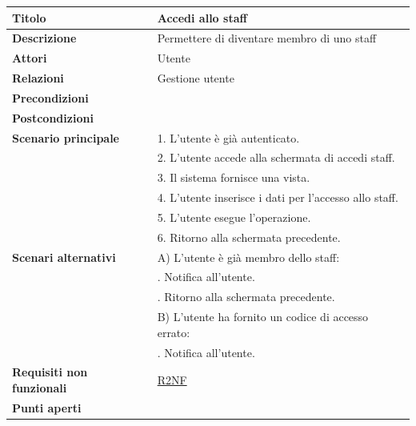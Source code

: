\documentclass[a4paper]{article}
\begin{document}
\begin{center}
\begin{tabularx}{1\textwidth}{|l|X|}
    \hline
	\textbf{Titolo} & Accedi allo staff \\
	\hline
	\textbf{Descrizione} & Permettere di diventare membro di uno staff \\
	\hline
	\textbf{Attori} & Utente \\
	\hline
	\textbf{Relazioni} & Gestione utente\\
	\hline
	\textbf{Precondizioni} &  \\
	\hline
	\textbf{Postcondizioni} &  \\
	\hline
	\textbf{Scenario principale} & 1. L'utente è già autenticato.\\
	                             & 2. L'utente accede alla schermata di accedi staff. \\
								 & 3. Il sistema fornisce una vista. \\
								 & 4. L'utente inserisce i dati per l'accesso allo staff. \\
								 & 5. L'utente esegue l'operazione.\\
								 & 6. Ritorno alla schermata precedente.\\
	\hline
	\textbf{Scenari alternativi} & A) L'utente è già membro dello staff:\\
								 & \quad 1. Notifica all'utente.\\
								 & \quad 2. Ritorno alla schermata precedente.\\
								 & B) L'utente ha fornito un codice di accesso errato:\\
								 & \quad 1. Notifica all'utente.\\
	\hline
	\textbf{Requisiti non funzionali} & \hyperlink{R2NF}{R2NF} \\
	\hline
	\textbf{Punti aperti} & \\
	\hline
\end{tabularx}
\end{center}


\end{document}
